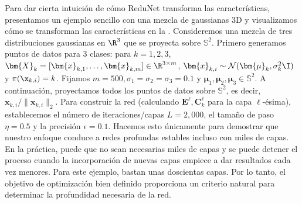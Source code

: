 \documentclass[../../book-main.tex]{subfiles}
\begin{document}
\begin{example}
    Para dar cierta intuición de cómo ReduNet transforma las características,
    presentamos un ejemplo sencillo con una mezcla de gaussianas 3D y visualizamos
    cómo se transforman las características en la .
    Consideremos una mezcla de tres distribuciones gaussianas en $\R^{3}$
    que se proyecta sobre $\mathbb{S}^2$. Primero generamos puntos de datos
    para 3 clases: para $k=1,2,3$, $\bm{X}_{k}=[\bm{x}_{k,1},
    \ldots, \bm{x}_{k,m}] \in \R^{3\times m}$, $\bm{x}_{k,i} \sim
    \mathcal{N}(\bm{\mu}_{k}, \sigma_{k}^{2} \I)$ y ${\pi}(\x_{k,i}) = k$.
    Fijamos $m=500, \sigma_{1}=\sigma_{2}=\sigma_{3}=0.1$ y
    $\bm{\mu}_{1}, \bm{\mu}_{2}, \bm{\mu}_{3} \in \mathbb{S}^2$.
    A continuación, proyectamos todos los puntos de datos sobre $\mathbb{S}^{2}$, es decir,
    $\bm{x}_{k,i}/\|\bm{x}_{k,i}\|_{2}$.
    Para construir la red (calculando $\bm{E}^{\ell},
    \bm{C}^{\ell}_{k}$ para la capa $\ell$-ésima), establecemos el número de
    iteraciones/capas $L=2,000$, el tamaño de paso $\eta=0.5$ y la precisión
    $\epsilon=0.1$.
    Hacemos esto únicamente para demostrar que nuestro enfoque conduce a
    redes profundas estables incluso con miles de capas.
    En la práctica, puede que no sean necesarias miles de capas y se puede
    detener el proceso cuando la incorporación de nuevas capas empiece a dar resultados cada vez menores.
    Para este ejemplo, bastan unas doscientas capas.
    Por lo tanto, el objetivo de optimización bien definido proporciona un criterio natural
    para determinar la profundidad necesaria de la red.


\end{example}
\end{document}
